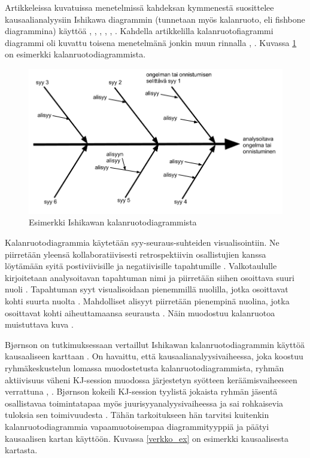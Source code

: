 Artikkeleissa kuvatuissa menetelmissä kahdeksan kymmenestä suosittelee kausaalianalyysiin Ishikawa diagrammin (tunnetaan myös kalanruoto, eli fishbone diagrammina) käyttöä \citep{kalinowski2012evidence}, \citep{de2004learning}, \citep{staalhane2004root}, \citep{dingsoyr2003extending}, \citep{birk2002postmortem}, \citep{card1998learning}. Kahdella artikkelilla kalanruotofiagrammi diagrammi oli kuvattu toisena menetelmänä jonkin muun rinnalla \citep{Bjornson2009}, \citep{staalhane2003post}. Kuvassa \ref{ishikawa_ex} on esimerkki kalanruotodiagrammista.

\begin{figure}[ht!]
\centering
\includegraphics[width=150mm]{ishikawa_esimerkki.png}
\caption{Esimerkki Ishikawan kalanruotodiagrammista}
\label{ishikawa_ex}
\end{figure}

Kalanruotodiagrammia käytetään syy-seuraus-suhteiden visualisointiin. Ne piirretään yleensä kollaboratiivisesti retrospektiivin osallistujien kanssa löytämään syitä postiviivisille ja negatiivisille tapahtumille \citep{birk2002postmortem}. Valkotaululle kirjoitetaan analysoitavan tapahtuman nimi ja piirretään siihen osoittava suuri nuoli \citep{Bjornson2009}. Tapahtuman syyt visualisoidaan pienemmillä nuolilla, jotka osoittavat kohti suurta nuolta \citep{Bjornson2009}. Mahdolliset alisyyt piirretään pienempinä nuolina, jotka osoittavat kohti aiheuttamaansa seurausta \citep{Bjornson2009}. Näin muodostuu kalanruotoa muistuttava kuva \citep{birk2002postmortem}.

Bj{\o}rnson on tutkimuksessaan vertaillut Ishikawan kalanruotodiagrammin käyttöä kausaaliseen karttaan \citep{Bjornson2009}. On havaittu, että kausaalianalyysivaiheessa, joka koostuu ryhmäkeskustelun lomassa muodostetusta kalanruotodiagrammista, ryhmän aktiivisuus väheni KJ-session muodossa järjestetyn syötteen keräämisvaiheeseen verrattuna \citep{Bjornson2009}, \citep{staalhane2003post}. Bj{\o}rnson kokeili KJ-session tyylistä jokaista ryhmän jäsentä osallistavaa toimintatapaa myös juurisyyanalyysivaiheessa  ja sai rohkaisevia tuloksia sen toimivuudesta \citep{Bjornson2009}. Tähän tarkoitukseen hän tarvitsi kuitenkin kalanruotodiagrammia vapaamuotoisempaa diagrammityyppiä ja päätyi kausaalisen kartan käyttöön. Kuvassa \ref{verkko_ex} on esimerkki kausaalisesta kartasta.

